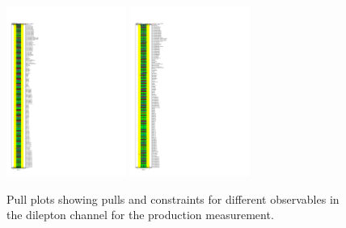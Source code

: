 \begin{figure}[ht]
  \centering
  \includegraphics[width=0.35\textwidth]{figures/diff_xsec/dilep_tty_prod_mu_blinded/compare_NP_pulls/compare_NP_dilep_fits_pt_ptj1_ptll/NuisPar_comp.pdf}%
  \includegraphics[width=0.35\textwidth]{figures/diff_xsec/dilep_tty_prod_mu_blinded/compare_NP_pulls/compare_NP_dilep_fits_dr_dr1_dr2/NuisPar_comp.pdf}%
  \caption{Pull plots showing pulls and constraints for different observables in the dilepton channel for the \tty production measurement.}
  \label{fig:pull_plot_pt_tty_dec_free_dilep_mu_blinded_1}
\end{figure}
\FloatBarrier

